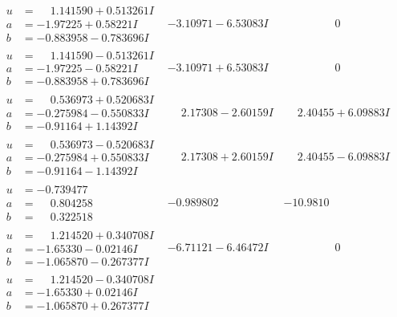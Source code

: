 \documentclass[1p]{elsarticle_modified}
\theoremstyle{definition}
\begin{document}
$$\begin{array}{c|c|c}
\begin{aligned}
u &= \phantom{-}1.141590 + 0.513261 I \\
a &= -1.97225 + 0.58221 I \\
b &= -0.883958 - 0.783696 I\end{aligned}
 & -3.10971 - 6.53083 I & \phantom{-0.000000 } 0 \\ \hline\begin{aligned}
u &= \phantom{-}1.141590 - 0.513261 I \\
a &= -1.97225 - 0.58221 I \\
b &= -0.883958 + 0.783696 I\end{aligned}
 & -3.10971 + 6.53083 I & \phantom{-0.000000 } 0 \\ \hline\begin{aligned}
u &= \phantom{-}0.536973 + 0.520683 I \\
a &= -0.275984 - 0.550833 I \\
b &= -0.91164 + 1.14392 I\end{aligned}
 & \phantom{-}2.17308 - 2.60159 I & \phantom{-}2.40455 + 6.09883 I \\ \hline\begin{aligned}
u &= \phantom{-}0.536973 - 0.520683 I \\
a &= -0.275984 + 0.550833 I \\
b &= -0.91164 - 1.14392 I\end{aligned}
 & \phantom{-}2.17308 + 2.60159 I & \phantom{-}2.40455 - 6.09883 I \\ \hline\begin{aligned}
u &= -0.739477\phantom{ +0.000000I} \\
a &= \phantom{-}0.804258\phantom{ +0.000000I} \\
b &= \phantom{-}0.322518\phantom{ +0.000000I}\end{aligned}
 & -0.989802\phantom{ +0.000000I} & -10.9810\phantom{ +0.000000I} \\ \hline\begin{aligned}
u &= \phantom{-}1.214520 + 0.340708 I \\
a &= -1.65330 - 0.02146 I \\
b &= -1.065870 - 0.267377 I\end{aligned}
 & -6.71121 - 6.46472 I & \phantom{-0.000000 } 0 \\ \hline\begin{aligned}
u &= \phantom{-}1.214520 - 0.340708 I \\
a &= -1.65330 + 0.02146 I \\
b &= -1.065870 + 0.267377 I\end{aligned}

\end{array}$$
\end{document}

